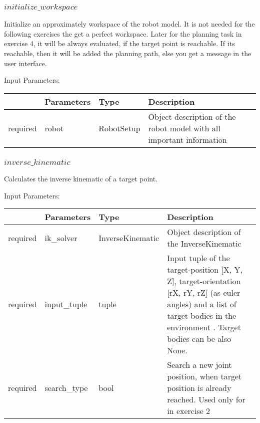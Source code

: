 \documentclass[
	ngerman,
	accentcolor=9c,%
	type=intern,
	marginpar=false
	]{tudapub}
\begin{document}
\subsubsection{$initialize\_workspace$}
\noindent Initialize an approximately workspace of the robot model. It is not needed for the following exercises the get a perfect workspace. Later for the planning task in exercise 4, it will be always evaluated, if the target point is reachable. If its reachable, then it will be added the planning path, else you get a message in the user interface.

\vspace{0.5cm}
\noindent Input Parameters:
\vspace{0.5cm}

\begin{tabular}{|p{}|p{}|p{}| p{}|}
\hline
 & \textbf{Parameters} & \textbf{Type} & \textbf{Description} \\
\hline
required & robot & RobotSetup & Object description of the robot model with all important information\\
\hline
\end{tabular}

\vspace{0.2cm}

\subsubsection{$inverse\_kinematic$}
\noindent Calculates the inverse kinematic of a target point. 

\vspace{0.5cm}
\noindent Input Parameters:
\vspace{0.5cm}

\begin{tabular}{|p{}|p{}|p{}| p{}|}
\hline
 & \textbf{Parameters} & \textbf{Type} & \textbf{Description} \\
\hline
required & ik\_solver & InverseKinematic & Object description of the InverseKinematic \\
\hline
required & input\_tuple & tuple & Input tuple of the target-position [X, Y, Z], target-orientation [rX, rY, rZ] (as euler angles) and a list of target bodies in the environment . Target bodies can be  also None. \\
\hline
required & search\_type & bool & Search a new joint position, when target position is already reached. Used only for in exercise 2 \\
\hline
\end{tabular}
\end{document}
